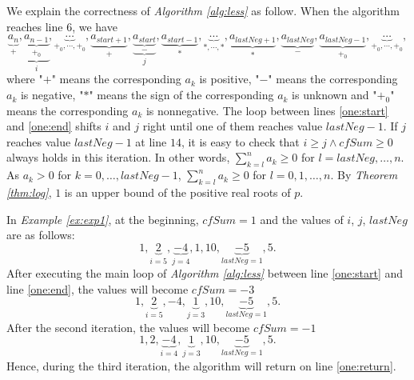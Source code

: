 We explain the correctness of {\em Algorithm \ref{alg:less}} as follow. When the algorithm reaches line $6$, we have \[\underbrace{a_n}_{+},\underbrace{\underbrace{a_{n-1}}_{+_0}}_{i},\underbrace{\cdots}_{+_0,\cdots,+_0},\underbrace{a_{start+1}}_{+},\underbrace{\underbrace{a_{start}}_{-}}_{j},\underbrace{a_{start-1}}_{*},\underbrace{\cdots}_{*,\cdots,*},\underbrace{a_{lastNeg+1}}_{*},\underbrace{a_{lastNeg}}_{-},\underbrace{a_{lastNeg-1}}_{+_0},\underbrace{\cdots}_{+_0,\cdots,+_0},\]
where "$+$" means the corresponding $a_k$ is positive, "$-$" means the corresponding $a_k$ is negative, "$*$" means the sign of the
corresponding $a_k$ is unknown and  "$+_0$" means the corresponding $a_k$ is nonnegative.
The loop between lines \ref{one:start} and \ref{one:end} shifts $i$ and $j$ right until one of them reaches value $lastNeg-1$. If $j$ reaches value $lastNeg-1$ at line $14$,  it is easy to check that $i\ge j\wedge cfSum\ge 0$ always holds in this iteration. In other words, $\sum_{k=l}^na_k\ge 0$ for $l=lastNeg,\ldots,n$. As $a_{k}>0$ for $k=0,\ldots, lastNeg-1$, $\sum_{k=l}^na_k\ge 0$ for $l=0,1,\ldots, n$. By {\em Theorem  \ref{thm:log}},  $1$ is an upper bound of the positive real roots of $p$.

In {\em Example \ref{ex:exp1}}, at the beginning, $cfSum=1$ and the values of  $i$, $j$, $lastNeg$ are as follows:
	\[1,\underbrace{2}_{i=5},\underbrace{-4}_{j=4},1,10,\underbrace{-5}_{lastNeg=1},5.\]
After executing the main loop of {\em Algorithm \ref{alg:less}} between line \ref{one:start} and line \ref{one:end}, the values will become
	$cfSum=-3$	\[1,\underbrace{2}_{i=5},-4,\underbrace{1}_{j=3},10,\underbrace{-5}_{lastNeg=1},5.\]
		After the second iteration, the values will become
		$cfSum=-1$	\[1,2,\underbrace{-4}_{i=4},\underbrace{1}_{j=3},10,\underbrace{-5}_{lastNeg=1},5.\] Hence, during the third iteration, the algorithm will return on line \ref{one:return}.

